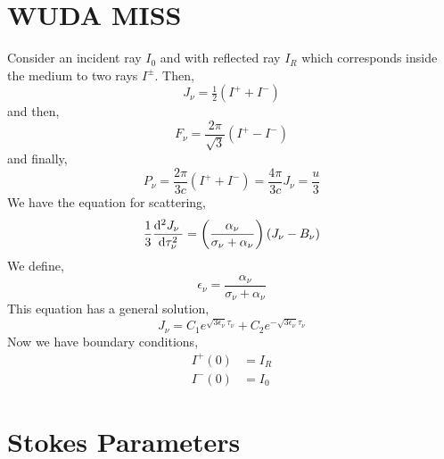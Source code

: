 \documentclass[11pt, a4paper]{article}
\begin{document}
\section{WUDA MISS}

Consider an incident ray $I_0$ and with reflected ray $I_R$ which corresponds inside the medium to two rays $I^\pm$. Then,
\[ J_\nu = \tfrac{1}{2} (I^+ + I^-) \]
and then,
\[ F_\nu = \frac{2 \pi}{\sqrt{3}} (I^+ - I^-) \]
and finally,
\[ P_\nu = \frac{2 \pi}{3c} (I^+ + I^-) = \frac{4 \pi}{3 c} J_\nu = \frac{u}{3} \]
We have the equation for scattering,
\[ \frac{1}{3} \frac{\mathrm{d}^{2} J_\nu \:}{\: \mathrm{d}\tau_\nu^{2} \:} = \left( \frac{\alpha_\nu}{\sigma_\nu + \alpha_\nu} \right) \left(J_\nu - B_\nu \right) \]
We define,
\[ \epsilon_\nu =  \frac{\alpha_\nu}{\sigma_\nu + \alpha_\nu} \] 
This equation has a general solution,
\[ J_\nu = C_1 e^{\sqrt{3 \epsilon_\nu} \tau_\nu} + C_2 e^{- \sqrt{3 \epsilon_\nu} \tau_\nu} \]
Now we have boundary conditions,
\begin{align*}
I^+(0) & = I_R
\\
I^{-}(0) & = I_0
\end{align*}

\section{Stokes Parameters}
\end{document}
